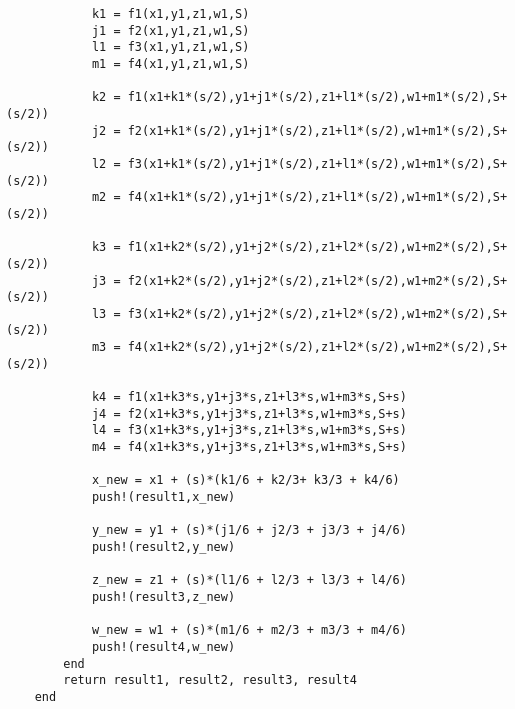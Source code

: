 \begin{lstlisting}
            k1 = f1(x1,y1,z1,w1,S)
            j1 = f2(x1,y1,z1,w1,S)
            l1 = f3(x1,y1,z1,w1,S)
            m1 = f4(x1,y1,z1,w1,S)

            k2 = f1(x1+k1*(s/2),y1+j1*(s/2),z1+l1*(s/2),w1+m1*(s/2),S+(s/2))
            j2 = f2(x1+k1*(s/2),y1+j1*(s/2),z1+l1*(s/2),w1+m1*(s/2),S+(s/2))
            l2 = f3(x1+k1*(s/2),y1+j1*(s/2),z1+l1*(s/2),w1+m1*(s/2),S+(s/2))
            m2 = f4(x1+k1*(s/2),y1+j1*(s/2),z1+l1*(s/2),w1+m1*(s/2),S+(s/2))

            k3 = f1(x1+k2*(s/2),y1+j2*(s/2),z1+l2*(s/2),w1+m2*(s/2),S+(s/2))
            j3 = f2(x1+k2*(s/2),y1+j2*(s/2),z1+l2*(s/2),w1+m2*(s/2),S+(s/2))
            l3 = f3(x1+k2*(s/2),y1+j2*(s/2),z1+l2*(s/2),w1+m2*(s/2),S+(s/2))
            m3 = f4(x1+k2*(s/2),y1+j2*(s/2),z1+l2*(s/2),w1+m2*(s/2),S+(s/2))

            k4 = f1(x1+k3*s,y1+j3*s,z1+l3*s,w1+m3*s,S+s)
            j4 = f2(x1+k3*s,y1+j3*s,z1+l3*s,w1+m3*s,S+s)
            l4 = f3(x1+k3*s,y1+j3*s,z1+l3*s,w1+m3*s,S+s)
            m4 = f4(x1+k3*s,y1+j3*s,z1+l3*s,w1+m3*s,S+s)

            x_new = x1 + (s)*(k1/6 + k2/3+ k3/3 + k4/6)
            push!(result1,x_new)

            y_new = y1 + (s)*(j1/6 + j2/3 + j3/3 + j4/6)
            push!(result2,y_new)

            z_new = z1 + (s)*(l1/6 + l2/3 + l3/3 + l4/6)
            push!(result3,z_new)

            w_new = w1 + (s)*(m1/6 + m2/3 + m3/3 + m4/6)
            push!(result4,w_new)
        end
        return result1, result2, result3, result4
    end
\end{lstlisting}
